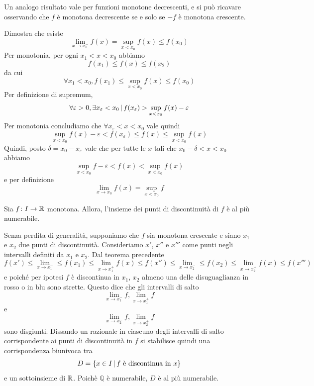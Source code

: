 \documentclass[a4paper]{article}
\begin{document}
Un analogo risultato vale per funzioni monotone decrescenti,
e si può ricavare osservando che \(f\) è monotona decrescente se e solo se \(-f\)
è monotona crescente.

\begin{snippetproof}{}
    Dimostra che esiste
    \[
        \lim_{x \to x_0^-} f(x) = \sup_{x < x_0} f(x) \leq f(x_0)
    \]
    Per monotonia, per ogni \(x_1 < x < x_0\) abbiamo
    \[
        f(x_1) \leq f(x) \leq f(x_2)
    \]
    da cui
    \[
        \forall x_1 < x_0, f(x_1) \leq \sup_{x < x_0} f(x)  \leq f(x_0)
    \]
    Per definizione di supremum,
    \[
        \forall \varepsilon>0, \exists x_\varepsilon < x_0 \,|\, f(x_\varepsilon) > \sup_{x < x_0} f(x) - \varepsilon 
    \]
    Per monotonia concludiamo che \(\forall x_\varepsilon < x < x_0\) vale quindi
    \[
        \sup_{x < x_0} f(x) - \varepsilon < f(x_\varepsilon) \leq f(x) \leq \sup_{x < x_0} f(x) 
    \]
    Quindi, posto \(\delta = x_0 - x_\varepsilon\) vale che per tutte le \(x\) tali che
    \(x_0 - \delta < x < x_0\) abbiamo
    \[
        \sup_{x < x_0} f - \varepsilon < f(x) < \sup_{x < x_0} f(x)
    \]
    e per definizione
    \[
        \lim_{x\to x_0} f(x) = \sup_{x < x_0} f
    \]
\end{snippetproof}

\begin{snippetcorollary}{}
    Sia \(f\colon I \to \mathbb{R}\) monotona. Allora, l'insieme dei punti di discontinuità
    di \(f\) è al più numerabile.
\end{snippetcorollary}

\begin{snippetproof}{}
    Senza perdita di generalità, supponiamo
    che \(f\) sia monotona crescente e siano \(x_1\) e \(x_2\)
    due punti di discontinuità.
    Consideriamo \(x'\), \(x''\) e \(x'''\) come punti negli intervalli definiti da \(x_1\)
    e \(x_2\).
    Dal teorema precedente
    \[
        f(x') \leq \lim_{x\to x_1^-} \leq f(x_1) \leq \lim_{x \to x_1^+} f(x)
        \leq f(x'') \leq \lim_{x\to x_2^-} \leq f(x_2)
        \leq \lim_{x\to x_2^+} f(x) \leq f(x''')
    \]
    e poiché per ipotesi \(f\) è discontinua in \(x_1\), \(x_2\)
    almeno una delle disuguaglianza in rosso o in blu sono strette. %
    Questo dice che gli intervalli di salto 
    \[
        \lim_{x\to x_1^-} f, \lim_{x\to x_1^+} f
    \]
    e
    \[
        \lim_{x\to x_2^-} f, \lim_{x\to x_2^+} f
    \]
    sono disgiunti. Dissando un razionale in ciascuno degli intervalli di salto corrispondente
    ai punti di discontinuità in \(f\) si stabilisce quindi una corrispondenza biunivoca tra
    \[
        D=\{x \in I \,|\, f \text{ è discontinua in } x\}
    \]
    e un sottoinsieme di \(\mathbb{R}\). Poichè \(\mathbb{Q}\)
    è numerabile, \(D\) è al più numerabile.
\end{snippetproof}
\end{document}
